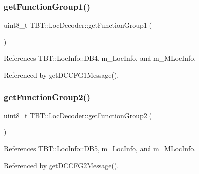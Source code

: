 \subsubsection{\texorpdfstring{get\+Function\+Group1()}{getFunctionGroup1()}}
{\footnotesize\ttfamily uint8\+\_\+t T\+B\+T\+::\+Loc\+Decoder\+::get\+Function\+Group1 (\begin{DoxyParamCaption}{ }\end{DoxyParamCaption})\hspace{0.3cm}{\ttfamily [inline]}}



References T\+B\+T\+::\+Loc\+Info\+::\+D\+B4, m\+\_\+\+Loc\+Info, and m\+\_\+\+M\+Loc\+Info.



Referenced by get\+D\+C\+C\+F\+G1\+Message().

\mbox{\label{classTBT_1_1LocDecoder_a5a23ba503d7b4798ac8c00019e4d3557_a5a23ba503d7b4798ac8c00019e4d3557}} 
\subsubsection{\texorpdfstring{get\+Function\+Group2()}{getFunctionGroup2()}}
{\footnotesize\ttfamily uint8\+\_\+t T\+B\+T\+::\+Loc\+Decoder\+::get\+Function\+Group2 (\begin{DoxyParamCaption}{ }\end{DoxyParamCaption})\hspace{0.3cm}{\ttfamily [inline]}}



References T\+B\+T\+::\+Loc\+Info\+::\+D\+B5, m\+\_\+\+Loc\+Info, and m\+\_\+\+M\+Loc\+Info.



Referenced by get\+D\+C\+C\+F\+G2\+Message().

\mbox{\label{classTBT_1_1LocDecoder_a756c41f02751356fb934252b20c8b0f0_a756c41f02751356fb934252b20c8b0f0}} 
